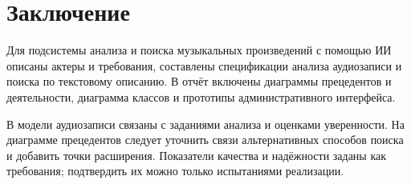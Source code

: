 \section{Заключение}

Для подсистемы анализа и поиска музыкальных произведений с помощью ИИ описаны
актеры и требования, составлены спецификации анализа аудиозаписи и поиска
по текстовому описанию. В отчёт включены диаграммы прецедентов и деятельности,
диаграмма классов и прототипы административного интерфейса.

В модели аудиозаписи связаны с заданиями анализа и оценками уверенности.
На диаграмме прецедентов следует уточнить связи альтернативных способов поиска
и добавить точки расширения. Показатели качества и надёжности заданы как
требования; подтвердить их можно только испытаниями реализации.
